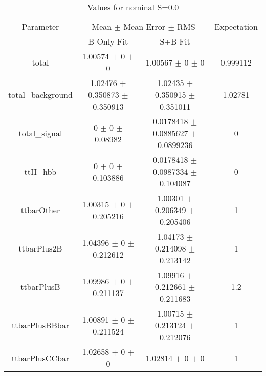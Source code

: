 \begin{table}
\centering
\caption{Values for nominal S=0.0}
\begin{tabular}{cccc}
\toprule
Parameter & \multicolumn{2}{c}{Mean $\pm$ Mean Error $\pm$ RMS} & Expectation\\
 & B-Only Fit & S+B Fit & \\
\midrule
total & \num{1.00574} $\pm$ \num{0} $\pm$ \num{0} & \num{1.00567} $\pm$ \num{0} $\pm$ \num{0} & \num{0.999112}\\
total\_background & \num{1.02476} $\pm$ \num{0.350873} $\pm$ \num{0.350913} & \num{1.02435} $\pm$ \num{0.350915} $\pm$ \num{0.351011} & \num{1.02781}\\
total\_signal & \num{0} $\pm$ \num{0} $\pm$ \num{0.08982} & \num{0.0178418} $\pm$ \num{0.0885627} $\pm$ \num{0.0899236} & \num{0}\\
ttH\_hbb & \num{0} $\pm$ \num{0} $\pm$ \num{0.103886} & \num{0.0178418} $\pm$ \num{0.0987334} $\pm$ \num{0.104087} & \num{0}\\
ttbarOther & \num{1.00315} $\pm$ \num{0} $\pm$ \num{0.205216} & \num{1.00301} $\pm$ \num{0.206349} $\pm$ \num{0.205406} & \num{1}\\
ttbarPlus2B & \num{1.04396} $\pm$ \num{0} $\pm$ \num{0.212612} & \num{1.04173} $\pm$ \num{0.214098} $\pm$ \num{0.213142} & \num{1}\\
ttbarPlusB & \num{1.09986} $\pm$ \num{0} $\pm$ \num{0.211137} & \num{1.09916} $\pm$ \num{0.212661} $\pm$ \num{0.211683} & \num{1.2}\\
ttbarPlusBBbar & \num{1.00891} $\pm$ \num{0} $\pm$ \num{0.211524} & \num{1.00715} $\pm$ \num{0.213124} $\pm$ \num{0.212076} & \num{1}\\
ttbarPlusCCbar & \num{1.02658} $\pm$ \num{0} $\pm$ \num{0} & \num{1.02814} $\pm$ \num{0} $\pm$ \num{0} & \num{1}\\
\bottomrule
\end{tabular}
\end{table}